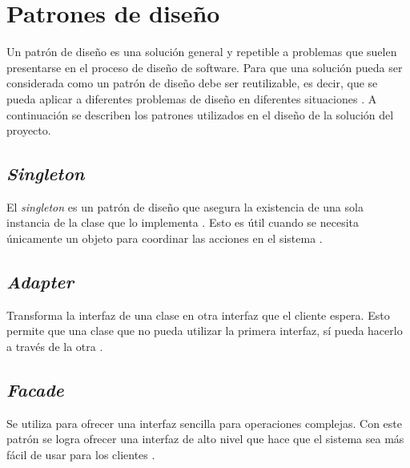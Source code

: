 \section{Patrones de diseño} \label{sect:Patrones de diseno}

Un patrón de diseño es una solución general y repetible a problemas que suelen presentarse en el proceso de diseño de software. Para que una solución pueda ser considerada como un patrón de diseño debe ser reutilizable, es decir, que se pueda aplicar a diferentes problemas de diseño en diferentes situaciones \cite{DSP0}. A continuación se describen los patrones utilizados en el diseño de la solución del proyecto.


\subsection{\textit{Singleton}}

El \textit{singleton} es un patrón de diseño que asegura la existencia de una sola instancia de la clase que lo implementa \cite{DSP1}. Esto es útil cuando se necesita únicamente un objeto para coordinar las acciones en el sistema \cite{SNG0}.

\subsection{\textit{Adapter}}

Transforma la interfaz de una clase en otra interfaz que el cliente espera. Esto permite que una clase que no pueda utilizar la primera interfaz, sí pueda hacerlo a través de la otra \cite{DSP1}.

\subsection{\textit{Facade}}

Se utiliza para ofrecer una interfaz sencilla para operaciones complejas. Con este patrón se logra ofrecer una interfaz de alto nivel que hace que el sistema sea más fácil de usar para los clientes \cite{DSP1}.

